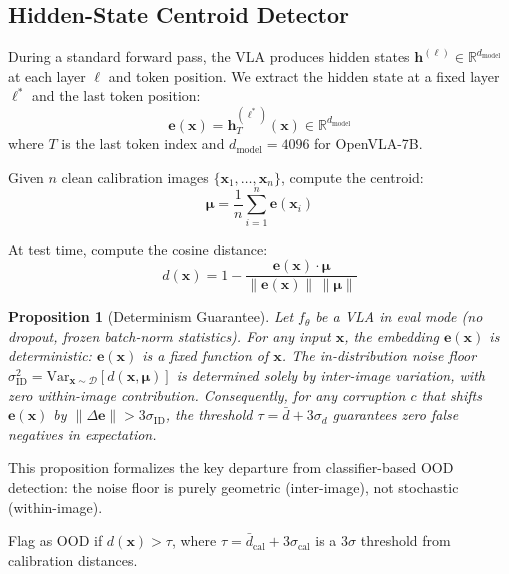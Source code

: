 \documentclass[11pt]{article}
\newtheorem{proposition}{Proposition}
\newcommand{\RR}{\mathbb{R}}
\newcommand{\calD}{\mathcal{D}}
\newcommand{\bx}{\mathbf{x}}
\newcommand{\be}{\mathbf{e}}
\newcommand{\bmu}{\boldsymbol{\mu}}
\newcommand{\bh}{\mathbf{h}}
\begin{document}
\subsection{Hidden-State Centroid Detector}

During a standard forward pass, the VLA produces hidden states $\bh^{(\ell)} \in \RR^{d_\text{model}}$ at each layer $\ell$ and token position.
We extract the hidden state at a fixed layer $\ell^*$ and the last token position:
\begin{equation}
    \be(\bx) = \bh^{(\ell^*)}_{T}(\bx) \in \RR^{d_\text{model}}
    \label{eq:embedding}
\end{equation}
where $T$ is the last token index and $d_\text{model} = 4096$ for OpenVLA-7B.

Given $n$ clean calibration images $\{\bx_1, \ldots, \bx_n\}$, compute the centroid:
\begin{equation}
    \bmu = \frac{1}{n} \sum_{i=1}^{n} \be(\bx_i)
    \label{eq:centroid}
\end{equation}

At test time, compute the cosine distance:
\begin{equation}
    d(\bx) = 1 - \frac{\be(\bx) \cdot \bmu}{\|\be(\bx)\| \, \|\bmu\|}
    \label{eq:cosine}
\end{equation}

\begin{proposition}[Determinism Guarantee]
\label{prop:determinism}
Let $f_\theta$ be a VLA in eval mode (no dropout, frozen batch-norm statistics).
For any input $\bx$, the embedding $\be(\bx)$ is deterministic: $\be(\bx)$ is a fixed function of $\bx$.
The in-distribution noise floor $\sigma_\text{ID}^2 = \mathrm{Var}_{\bx \sim \calD}[d(\bx, \bmu)]$ is determined \emph{solely} by inter-image variation, with zero within-image contribution.
Consequently, for any corruption $c$ that shifts $\be(\bx)$ by $\|\Delta\be\| > 3\sigma_\text{ID}$, the threshold $\tau = \bar{d} + 3\sigma_d$ guarantees zero false negatives in expectation.
\end{proposition}
\noindent This proposition formalizes the key departure from classifier-based OOD detection: the noise floor is purely geometric (inter-image), not stochastic (within-image).

Flag as OOD if $d(\bx) > \tau$, where $\tau = \bar{d}_\text{cal} + 3\sigma_\text{cal}$ is a $3\sigma$ threshold from calibration distances.
\end{document}
